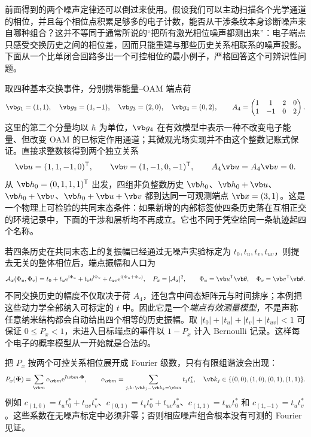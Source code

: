 前面得到的两个噪声定律还可以倒过来使用。假设我们可以主动扫描各个光学通道的相位，并且每个相位点积累足够多的电子计数，能否从干涉条纹本身诊断噪声来自哪种组合？这并不等同于通常所说的“把所有激光相位噪声都测出来”：电子端点只感受交换历史之间的相位差，因而只能重建与那些历史关系相联系的噪声投影。下面从一个比单闭合回路多出一个可控相位的最小例子，严格回答这个可辨识性问题。

取四种基本交换事件，分别携带能量--OAM 端点荷
\begin{equation}
 \vb g_1=(1,1),\quad \vb g_2=(1,-1),\quad
 \vb g_3=(2,0),\quad \vb g_4=(0,2),\qquad
 A_4=\begin{pmatrix}1&1&2&0\\1&-1&0&2\end{pmatrix}.
 \label{eq:oam-two-loop-charges}
\end{equation}
这里的第二个分量均以 $\hbar$ 为单位，$\vb g_4$ 在有效模型中表示一种不改变电子能量、但改变 OAM 的已标定作用通道；其微观光场实现并不由这个整数记账式保证。直接求整数核得到两个独立关系
\begin{equation}
 \vb u=(1,1,-1,0)^{\mathsf T},\qquad
 \vb v=(1,-1,0,-1)^{\mathsf T},\qquad
 A_4\vb u=A_4\vb v=0.
 \label{eq:oam-two-loop-basis}
\end{equation}
从 $\vb h_0=(0,1,1,1)^{\mathsf T}$ 出发，四组非负整数历史 $\vb h_0$、$\vb h_0+\vb u$、$\vb h_0+\vb v$、$\vb h_0+\vb u+\vb v$ 都到达同一可观测端点 $\vb x=(3,1)$。这是一个物理上可检验的共同末态条件：如果新增的内部标签使四条历史落在互相正交的环境记录中，下面的干涉和层析均不再成立。它也不同于凭空给同一条轨迹起四个名称。

若四条历史在共同末态上的复振幅已经通过无噪声实验标定为 $t_0,t_u,t_v,t_{uv}$，则提去无关的整体相位后，端点振幅和人口为
\begin{equation}
 \mathcal A_x(\Phi_u,\Phi_v)=t_0+t_u\ee^{\ii\Phi_u}
 +t_v\ee^{\ii\Phi_v}+t_{uv}\ee^{\ii(\Phi_u+\Phi_v)},\quad
 P_x=|\mathcal A_x|^2,
 \qquad \Phi_u=\vb u^{\mathsf T}\vb\theta,\quad
 \Phi_v=\vb v^{\mathsf T}\vb\theta.
 \label{eq:oam-two-loop-amplitude}
\end{equation}
不同交换历史的幅度不仅取决于荷 $A_4$，还包含中间态矩阵元与时间排序；本例把这些动力学全部纳入可标定的 $t$ 中。因此它是一个\emph{端点有效测量模型}，不是声称任意纳米结构都会自动给出四个相等的历史振幅。取 $|t_0|+|t_u|+|t_v|+|t_{uv}|<1$ 可保证 $0\le P_x<1$，未进入目标端点的事件以 $1-P_x$ 计入 Bernoulli 记录。这样每个电子的概率模型从一开始就是合法的。

把 $P_x$ 按两个可控关系相位展开成 Fourier 级数，只有有限组谐波会出现：
\begin{equation}
 P_x(\boldsymbol\Phi)=\sum_{\vb m}c_{\vb m}\ee^{\ii\vb m\cdot\boldsymbol\Phi},\qquad
 c_{\vb m}=\sum_{j,k:\,\vb k_j-\vb k_k=\vb m}t_jt_k^*,
 \quad \vb k_j\in\{(0,0),(1,0),(0,1),(1,1)\}.
 \label{eq:oam-two-loop-fourier}
\end{equation}
例如 $c_{(1,0)}=t_ut_0^*+t_{uv}t_v^*$、$c_{(0,1)}=t_vt_0^*+t_{uv}t_u^*$、$c_{(1,1)}=t_{uv}t_0^*$ 和 $c_{(1,-1)}=t_ut_v^*$。这些系数在无噪声标定中必须非零；否则相应噪声组合根本没有可测的 Fourier 见证。

